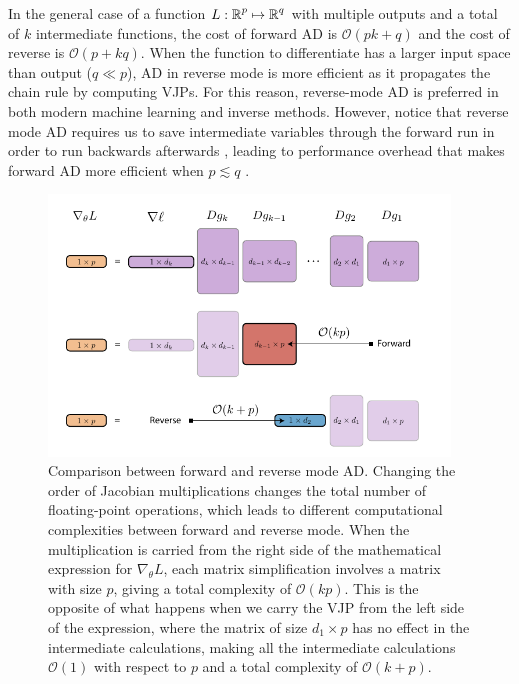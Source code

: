 In the general case of a function $L : \operatorname{\mathbb{R}}^p \mapsto \operatorname{\mathbb{R}}^q$ with multiple outputs and a total of $k$ intermediate functions, the cost of forward AD is $\mathcal O (pk + q)$ and the cost of reverse is $\mathcal O (p + kq)$.
When the function to differentiate has a larger input space than output ($q \ll p$), AD in reverse mode is more efficient as it propagates the chain rule by computing VJPs.
For this reason, reverse-mode AD is preferred in both modern machine learning and inverse methods.
However, notice that reverse mode AD requires us to save intermediate variables through the forward run in order to run backwards afterwards \cite{Bennett_1973}, leading to performance overhead that makes forward AD more efficient when $p \lesssim q$ \cite{Griewank_1989, Margossian_2018, Baydin_Pearlmutter_Radul_Siskind_2015}. 

\begin{figure}[t]
    \centering
    \includegraphics[width=0.95\textwidth]{figures/VJP-AD.pdf}
    \caption{Comparison between forward and reverse mode AD. Changing the order of Jacobian multiplications changes the total number of floating-point operations, which leads to different computational complexities between forward and reverse mode. When the multiplication is carried from the right side of the mathematical expression for $\nabla_\theta L$, each matrix simplification involves a matrix with size $p$, giving a total complexity of $\mathcal O (kp)$. This is the opposite of what happens when we carry the VJP from the left side of the expression, where the matrix of size $d_1 \times p$ has no effect in the intermediate calculations, making all the intermediate calculations $\mathcal O (1)$ with respect to $p$ and a total complexity of $\mathcal O (k + p)$. }
    \label{fig:vjp-jvp}
\end{figure}

